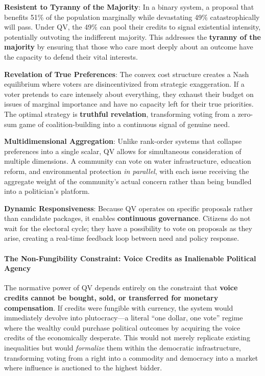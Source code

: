 \textbf{Resistent to Tyranny of the Majority}: In a binary system, a
proposal that benefits 51\% of the population marginally while
devastating 49\% catastrophically will pass. Under QV, the 49\% can pool
their credits to signal existential intensity, potentially outvoting the
indifferent majority. This addresses the \textbf{tyranny of the
majority} by ensuring that those who care most deeply about an outcome
have the capacity to defend their vital interests.

\textbf{Revelation of True Preferences}: The convex cost structure
creates a Nash equilibrium where voters are disincentivized from
strategic exaggeration. If a voter pretends to care intensely about
everything, they exhaust their budget on issues of marginal importance
and have no capacity left for their true priorities. The optimal
strategy is \textbf{truthful revelation}, transforming voting from a
zero-sum game of coalition-building into a continuous signal of genuine
need.

\textbf{Multidimensional Aggregation}: Unlike rank-order systems that
collapse preferences into a single scalar, QV allows for simultaneous
consideration of multiple dimensions. A community can vote on water
infrastructure, education reform, and environmental protection \emph{in
parallel}, with each issue receiving the aggregate weight of the
community's actual concern rather than being bundled into a politician's
platform.

\textbf{Dynamic Responsiveness}: Because QV operates on specific
proposals rather than candidate packages, it enables \textbf{continuous
governance}. Citizens do not wait for the electoral cycle; they have a
possibility to vote on proposals as they arise, creating a real-time
feedback loop between need and policy response.

\paragraph{The Non-Fungibility Constraint: Voice Credits as Inalienable
Political
Agency}\label{the-non-fungibility-constraint-voice-credits-as-inalienable-political-agency}

The normative power of QV depends entirely on the constraint that
\textbf{voice credits cannot be bought, sold, or transferred for
monetary compensation}. If credits were fungible with currency, the
system would immediately devolve into plutocracy---a literal ``one
dollar, one vote'' regime where the wealthy could purchase political
outcomes by acquiring the voice credits of the economically desperate.
This would not merely replicate existing inequalities but would
\emph{formalize} them within the democratic infrastructure, transforming
voting from a right into a commodity and democracy into a market where
influence is auctioned to the highest bidder.


